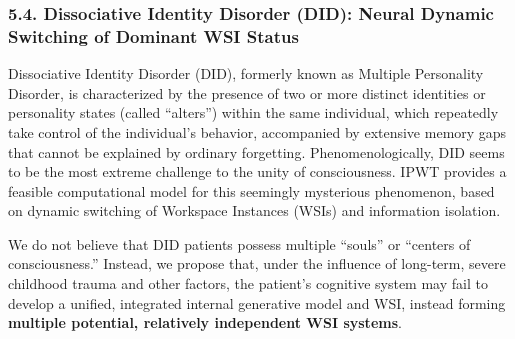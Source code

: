 \documentclass[
  a4paper]{article}
\begin{document}
\subsubsection{5.4. Dissociative Identity Disorder (DID): Neural Dynamic
Switching of Dominant WSI
Status}\label{dissociative-identity-disorder-did-neural-dynamic-switching-of-dominant-wsi-status}

Dissociative Identity Disorder (DID), formerly known as Multiple
Personality Disorder, is characterized by the presence of two or more
distinct identities or personality states (called ``alters'') within the
same individual, which repeatedly take control of the individual's
behavior, accompanied by extensive memory gaps that cannot be explained
by ordinary forgetting. Phenomenologically, DID seems to be the most
extreme challenge to the unity of consciousness. IPWT provides a
feasible computational model for this seemingly mysterious phenomenon,
based on dynamic switching of Workspace Instances (WSIs) and information
isolation.

We do not believe that DID patients possess multiple ``souls'' or
``centers of consciousness.'' Instead, we propose that, under the
influence of long-term, severe childhood trauma and other factors, the
patient's cognitive system may fail to develop a unified, integrated
internal generative model and WSI, instead forming \textbf{multiple
potential, relatively independent WSI systems}.
\end{document}
